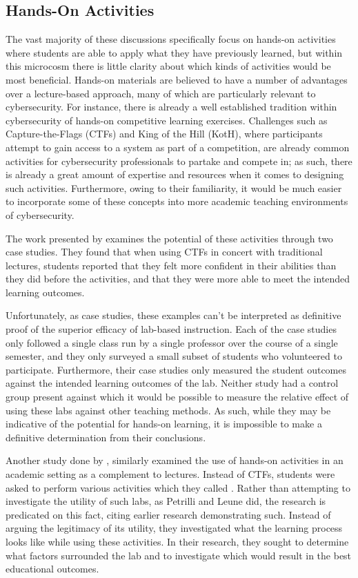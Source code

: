 \subsection{Hands-On Activities}


    The vast majority of these discussions specifically focus on hands-on activities where students are able to apply what they have previously learned, but within this microcosm there is little clarity about which kinds of activities would be most beneficial. Hands-on materials are believed to have a number of advantages over a lecture-based approach, many of which are particularly relevant to cybersecurity. For instance, there is already a well established tradition within cybersecurity of hands-on competitive learning exercises. Challenges such as Capture-the-Flags (CTFs) and King of the Hill (KotH), where participants attempt to gain access to a system as part of a competition, are already common activities for cybersecurity professionals to partake and compete in; as such, there is already a great amount of expertise and resources when it comes to designing such activities. Furthermore, owing to their familiarity, it would be much easier to incorporate some of these concepts into more academic teaching environments of cybersecurity.

    The work presented by \textcite{K-Leune} examines the potential of these activities through two case studies. They found that when using CTFs in concert with traditional lectures, students reported that they felt more confident in their abilities than they did before the activities, and that they were more able to meet the intended learning outcomes. 

    Unfortunately, as case studies, these examples can't be interpreted as definitive proof of the superior efficacy of lab-based instruction. Each of the case studies only followed a single class run by a single professor over the course of a single semester, and they only surveyed a small subset of students who volunteered to participate. Furthermore, their case studies only measured the student outcomes against the intended learning outcomes of the lab. Neither study had a control group present against which it would be possible to measure the relative effect of using these labs against other teaching methods. As such, while they may be indicative of the potential for hands-on learning, it is impossible to make a definitive determination from their conclusions.

    Another study done by \textcite{Z-Zeng}, similarly examined the use of hands-on activities in an academic setting as a complement to lectures. Instead of CTFs, students were asked to perform various activities which they called . Rather than attempting to investigate the utility of such labs, as Petrilli and Leune did, the research is predicated on this fact, citing earlier research demonstrating such. Instead of arguing the legitimacy of its utility, they investigated what the learning process looks like while using these activities. In their research, they sought to determine what factors surrounded the lab and to investigate which would result in the best educational outcomes. 


